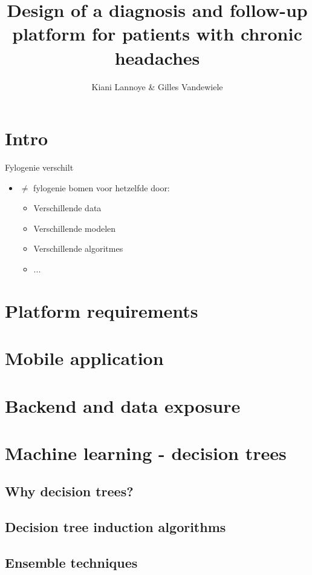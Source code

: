 \documentclass[english]{beamer}
\title{Design of a diagnosis and follow-up platform for patients with chronic headaches}
\author{Kiani Lannoye \& Gilles Vandewiele}
\begin{document}
\begin{frame}
	\titlepage
\end{frame}

\section{Intro}
\label{sec:intro}
\begin{frame}{Fylogenie verschilt}
\begin{itemize}
	\item $\neq$ fylogenie bomen voor hetzelfde door:
	\begin{itemize}
		\item Verschillende data
		\item Verschillende modelen
		\item Verschillende algoritmes
		\item ...
	\end{itemize}
\end{itemize}
\end{frame}
\section{Platform requirements}
\label{sec:simMess}
\section{Mobile application}
\section{Backend and data exposure}
\section{Machine learning - decision trees}

\subsection*{Why decision trees?}

\subsection*{Decision tree induction algorithms}

\subsection*{Ensemble techniques}
\end{document}
